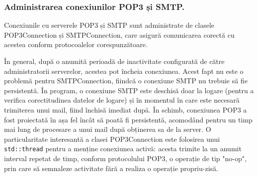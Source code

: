 \documentclass[runningheads]{llncs}
\begin{document}






\subsubsection{Administrarea conexiunilor POP3 și SMTP.}

Conexiunile cu serverele POP3 și SMTP sunt administrate de clasele POP3Connection și SMTPConnection, care asigură comunicarea corectă cu acestea conform protocoalelor corespunzătoare. 

În general, după o anumită perioadă de inactivitate configurată de către administratorii serverelor, acestea pot încheia conexiunea. Acest fapt nu este o problemă pentru SMTPConnection, fiindcă o conexiune SMTP nu trebuie să fie persistentă. În program, o conexiune SMTP este deschisă doar la logare (pentru a verifica corectitudinea datelor de logare) și în momentul în care este necesară trimiterea unui mail, fiind închisă imediat după. În schimb, conexiunea POP3 a fost proiectată în așa fel încât să poată fi persistentă, acomodând pentru un timp mai lung de procesare a unui mail după obținerea sa de la server. O particularitate interesantă a clasei POP3Connection este folosirea unui \texttt{std::thread} pentru a menține conexiunea activă: acesta trimite la un anumit interval repetat de timp, conform protocolului POP3, o operație de tip "no-op", prin care să semnaleze activitate fără a realiza o operație propriu-zisă.
\end{document}
